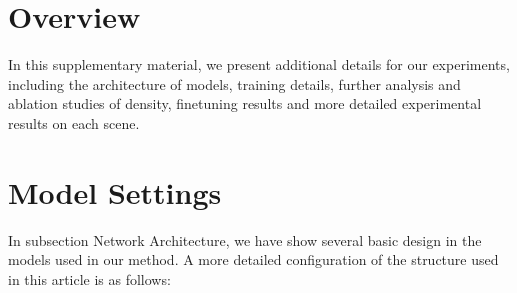 \documentclass[letterpaper]{article} \usepackage{aaai23}  \usepackage{times}  \usepackage{helvet}  \usepackage{courier}  \usepackage[hyphens]{url}  \usepackage{graphicx} \urlstyle{rm} \def\UrlFont{\rm}  \usepackage{natbib}  \usepackage{caption} \frenchspacing  \setlength{\pdfpagewidth}{8.5in}  \setlength{\pdfpageheight}{11in}  \usepackage{multirow}
\begin{document}
\section{Overview}
In this supplementary material, we present additional details for our experiments, including the architecture of models, training details, further analysis and ablation studies of density, finetuning results and more detailed experimental results on each scene.



\section{Model Settings}
In subsection Network Architecture, we have show several basic design in the models used in our method. A more detailed configuration of the structure used in this article is as follows:
\end{document}
